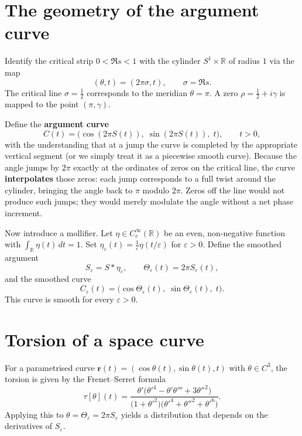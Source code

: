 \documentclass[12pt,a4paper]{article}
\newcommand{\R}{\mathbb{R}}
\begin{document}
\section{The geometry of the argument curve}

Identify the critical strip \(0<\Re s<1\) with the cylinder \(S^1\times\R\) of radius
\(1\) via the map
\[
(\theta, t) = (2\pi\sigma, t),\qquad \sigma = \Re s .
\]
The critical line \(\sigma = \frac12\) corresponds to the meridian \(\theta = \pi\).  A
zero \(\rho = \frac12 + i\gamma\) is mapped to the point \((\pi,\gamma)\).

Define the \textbf{argument curve}
\[
C(t) = \bigl( \cos(2\pi S(t)),\; \sin(2\pi S(t)),\; t \bigr),\qquad t>0,
\]
with the understanding that at a jump the curve is completed by the appropriate vertical
segment (or we simply treat it as a piecewise smooth curve).  Because the angle jumps by
\(2\pi\) exactly at the ordinates of zeros on the critical line, the curve
\textbf{interpolates} those zeros: each jump corresponds to a full twist around the
cylinder, bringing the angle back to \(\pi\) modulo \(2\pi\).  Zeros off the line would
not produce such jumps; they would merely modulate the angle without a net phase
increment.

Now introduce a mollifier.  Let \(\eta\in C_c^\infty(\R)\) be an even, non‑negative
function with \(\int_\R\eta(t)\,dt = 1\).  Set \(\eta_\varepsilon(t) = \frac1\varepsilon
\eta(t/\varepsilon)\) for \(\varepsilon>0\).  Define the smoothed argument
\[
S_\varepsilon = S * \eta_\varepsilon ,\qquad
\Theta_\varepsilon(t) = 2\pi S_\varepsilon(t),
\]
and the smoothed curve
\[
C_\varepsilon(t) = \bigl( \cos\Theta_\varepsilon(t),\;
                         \sin\Theta_\varepsilon(t),\; t \bigr).
\]
This curve is smooth for every \(\varepsilon>0\).

\section{Torsion of a space curve}

For a parametrised curve \(\mathbf{r}(t)=(\cos\theta(t),\sin\theta(t),t)\) with
\(\theta\in C^3\), the torsion is given by the Frenet–Serret formula
\begin{equation}\label{eq:torsion}
\tau[\theta](t) =
\frac{\theta'\bigl(\theta'^4 - \theta'\theta''' + 3\theta''^2\bigr)}
{\bigl(1+\theta'^2\bigr)\bigl(\theta'^4 + \theta''^2 + \theta'^6\bigr)} .
\end{equation}
Applying this to \(\theta = \Theta_\varepsilon = 2\pi S_\varepsilon\) yields a distribution
that depends on the derivatives of \(S_\varepsilon\).
\end{document}

